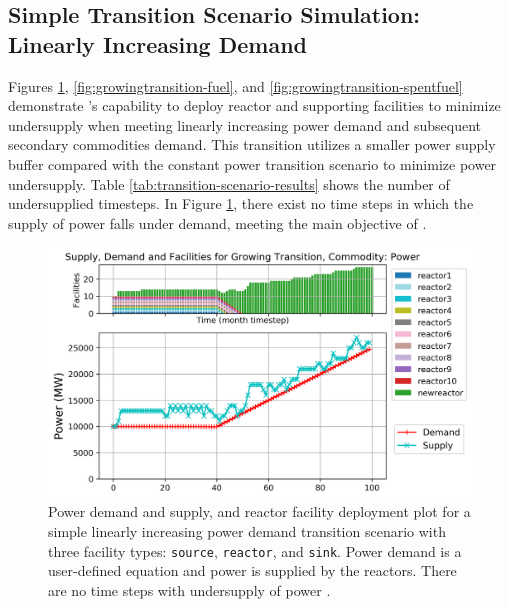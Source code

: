     \subsection{Simple Transition Scenario Simulation: Linearly Increasing Demand}

    Figures \ref{fig:growingtransition-power}, \ref{fig:growingtransition-fuel},
    and \ref{fig:growingtransition-spentfuel} demonstrate \deploy's capability 
    to deploy reactor and supporting facilities to minimize undersupply 
    when meeting linearly increasing power demand and subsequent secondary 
    commodities demand. 
    This transition utilizes a smaller power supply buffer compared with the constant 
    power transition scenario to minimize power undersupply.
    Table \ref{tab:transition-scenario-results} shows the number of 
    undersupplied timesteps. 
    In Figure \ref{fig:growingtransition-power}, there exist no time steps 
    in which the supply of power falls under demand, meeting the main 
    objective of \deploy. 
    
    \begin{figure}[]
        \centering
        \includegraphics[width=0.9\linewidth]{figures/growingtransition-power.png} 
            \caption{Power demand and supply, and reactor facility deployment plot for  
            a simple linearly increasing power demand transition scenario with 
            three facility types: \texttt{source}, \texttt{reactor}, and \texttt{sink}.
            Power demand is a user-defined equation and power is supplied by the reactors.
            There are no time steps with undersupply of power \cite{chee_arfc/transition-scenarios_2018}.}
            \label{fig:growingtransition-power}
    \end{figure}
    
